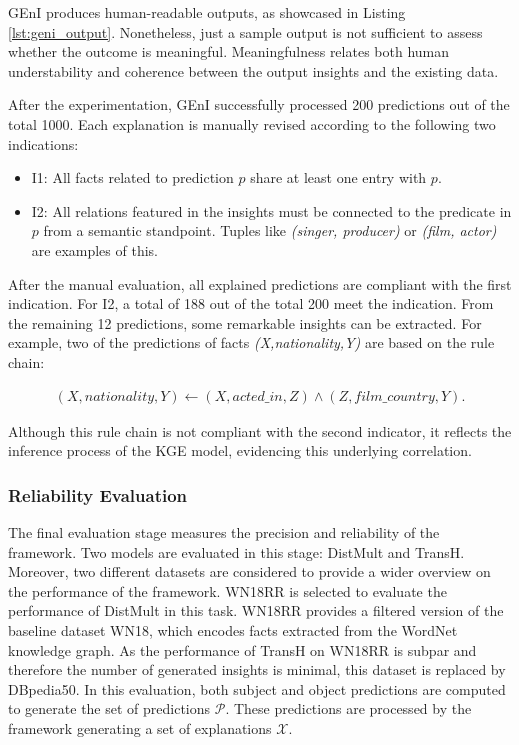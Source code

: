 GEnI produces human-readable outputs, as showcased in Listing \ref{lst:geni_output}. Nonetheless, just a sample output is not sufficient to assess whether the outcome is meaningful. Meaningfulness relates both human understability and coherence between the output insights and the existing data. 

After the experimentation, GEnI successfully processed 200 predictions out of the total 1000. Each explanation is manually revised according to the following two indications:
\begin{itemize}
    \item I1: All facts related to prediction $p$ share at least one entry with $p$.
    \item I2: All relations featured in the insights must be connected to the predicate in $p$ from a semantic standpoint. Tuples like \textit{(singer, producer)} or \textit{(film, actor)} are examples of this.
\end{itemize}

After the manual evaluation, all explained predictions are compliant with the first indication. For I2, a total of 188 out of the total 200 meet the indication. From the remaining 12 predictions, some remarkable insights can be extracted. For example, two of the predictions of facts \textit{(X,nationality,Y)} are based on the rule chain: 

\begin{align}
    (X, nationality, Y) \leftarrow (X, acted\_in, Z) \wedge (Z, film\_country, Y). 
\end{align}


Although this rule chain is not compliant with the second indicator, it reflects the inference process of the KGE model, evidencing this underlying correlation. 

\subsubsection{Reliability Evaluation}
The final evaluation stage measures the precision and reliability of the framework. Two models are evaluated in this stage: DistMult and TransH. Moreover, two different datasets are considered to provide a wider overview on the performance of the framework. WN18RR is selected to evaluate the performance of DistMult in this task. WN18RR provides a filtered version of the baseline dataset WN18, which encodes facts extracted from the WordNet knowledge graph. As the performance of TransH on WN18RR is subpar and therefore the number of generated insights is minimal, this dataset is replaced by DBpedia50. In this evaluation, both subject and object predictions are computed to generate the set of predictions $\mathcal{P}$. These predictions are processed by the framework generating a set of explanations $\mathcal{X}$. 

